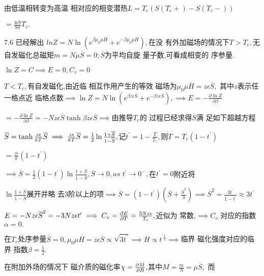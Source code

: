 \documentclass{ctexart}
\begin{document}
由低温相转变为高温%
相对应的相变潜热$%
L=T_{c}\left( S\left( T_{c}+\right) -S\left( T_{c}-\right) \right) $

$=\frac{4cb}{9d}T_{c}.$

7.6 已经解出 $lnZ=N\ln \left( e^{\beta \mu _{0}\mu 
\overline{H}}+e^{-\beta \mu _{0}\mu \overline{H}}\right) ,$在没%
有外加磁场的情况下$%
T>T_{c},$无自发磁化总磁矩$%
m=N\mu \overline{S}=0;\overline{S}$为平均自旋%
量子数,可看成相变的%
序参量.

$\ln Z=C\implies E=0,C_{v}=0$

$T<T_{c},$有自发磁化,由近临%
相互作用产生的等效%
磁场为$\mu _{0}\mu \overline{H}=z\epsilon \overline{S},$%
其中$z$表示任一格点近%
临格点数$\implies \ln Z=N\ln \left( e^{\beta
z\epsilon \overline{S}}+e^{-\beta z\epsilon \overline{S}}\right) ,\implies
E=-\frac{\partial \ln Z}{\partial \beta }$

$=-\frac{\partial \ln Z}{\partial \beta }=-Nz\epsilon \overline{S}\tanh
\beta z\epsilon \overline{S}\implies $由推导$T_{c}$的%
过程已经求得$\overline{S}$满%
足如下超越方程

$\overline{S}=\tanh \frac{z\epsilon }{kT}\overline{S}\implies \frac{%
z\epsilon }{kT}\overline{S}=\frac{1}{2}\ln \frac{1+\overline{S}}{1-\overline{%
S}},$记$t^{\prime }=1-\frac{T}{T_{c}},$则$T=T_{c}\left(
1-t^{\prime }\right) $

$=\frac{z\epsilon }{k}\left( 1-t^{\prime }\right) $

$\implies \overline{S}=\frac{1}{2}\left( 1-t^{\prime }\right) \ln \frac{1+%
\overline{S}}{1-\overline{S}},\overline{S}\rightarrow 0,as$ $t^{\prime
}\rightarrow 0^{-},$在$t^{\prime }=0$附近将

$\ln \frac{1+\overline{S}}{1-\overline{S}}$展开并略%
去3阶以上的项$\implies \overline{S}%
=\left( 1-t^{\prime }\right) \left( \overline{S}+\frac{\overline{S}^{3}}{3}%
\right) \implies \overline{S}^{2}=\frac{3t^{\prime }}{1-t^{\prime }}\approx
3t^{\prime }$

$E=-Nz\epsilon \overline{S}^{2}=-3Nz\epsilon t^{\prime }\implies C_{v}=\frac{%
\partial E}{\partial T}=\frac{3Nz\epsilon }{T_{c}},$近似为%
常数,$\implies C_{v}$ 对应的指数$%
\alpha =0.$

在$T_{c}$处序参量$\overline{S}=0,\mu _{0}\mu 
\overline{H}=z\epsilon \overline{S}\propto \sqrt{3t^{\prime }}\implies 
\overline{H}\propto t^{^{\prime }\frac{1}{2}}\implies $临界%
磁化强度对应的临界%
指数$\beta =\frac{1}{2}.$

在附加外场的情况下%
磁介质的磁化率$\chi =\frac{%
\partial M}{\partial B},$其中$M=\frac{m}{N}=\mu \overline{S},$%
而
\end{document}

